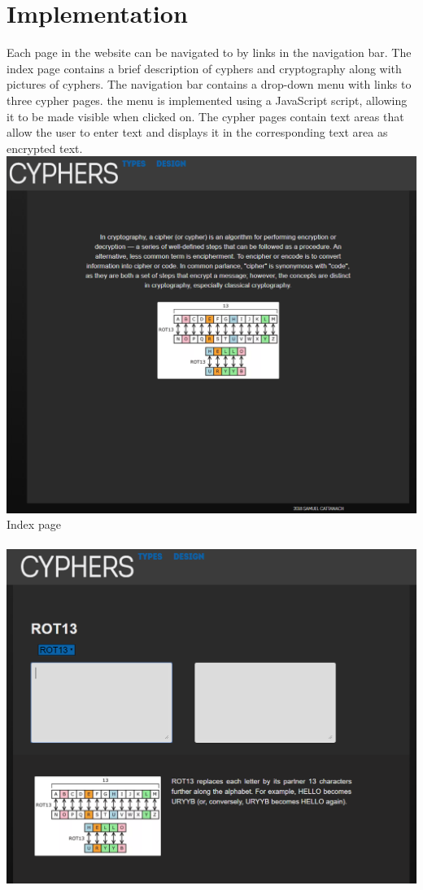 \documentclass[10pt, a4paper]{article}
\begin{document}
	
	\section{Implementation}
	Each page in the website can be navigated to by links in the navigation bar. The index page contains a brief description of cyphers and cryptography along with pictures of cyphers. The navigation bar contains a drop-down menu with links to three cypher pages. the menu is implemented using a JavaScript script, allowing it to be made visible when clicked on. The cypher pages contain text areas that allow the user to enter text and displays it in the corresponding text area as encrypted text.
	\\
	\includegraphics[scale=0.314]{index} 
	Index page
	\\\\
	\includegraphics[scale=0.293]{rot13}
\end{document}
